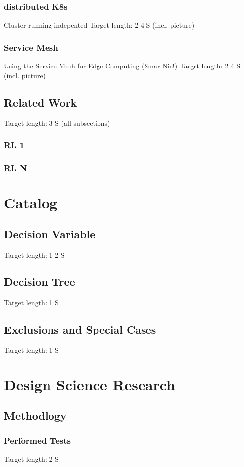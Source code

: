 \documentclass[MSC,Master,english]{twbook}%
\begin{document}
\subsection{distributed K8s}
Cluster running indepented
Target length: 2-4 S (incl. picture)
\subsection{Service Mesh}
Using the Service-Mesh for Edge-Computing (Smar-Nic!)
Target length: 2-4 S (incl. picture)

\section{Related Work}
Target length: 3 S (all subsections)
\subsection{RL 1}
\subsection{RL N}

\chapter{Catalog}
\section{Decision Variable}
Target length: 1-2 S
\section{Decision Tree}
Target length: 1 S
\section{Exclusions and Special Cases}
Target length: 1 S

\chapter{Design Science Research}
\section{Methodlogy}
\subsection{Performed Tests}
Target length: 2 S
\end{document}
